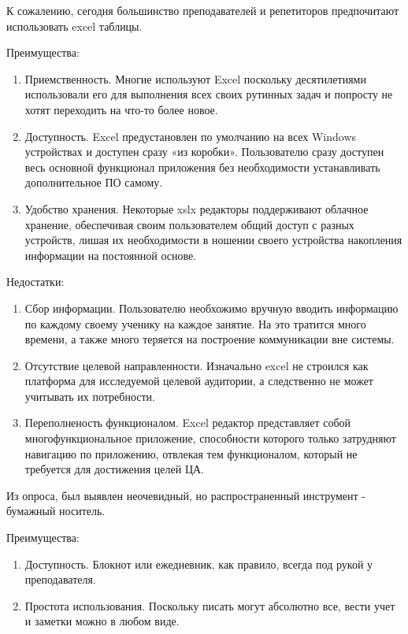 \documentclass[a4paper,14pt,oneside]{extreport}
\begin{document}
К сожалению, сегодня большинство преподавателей и репетиторов предпочитают использовать excel таблицы.

Преимущества:

\begin{enumerate}
    \item Приемственность. Многие используют Excel поскольку десятилетиями использовали его для выполнения всех своих рутинных задач и попросту не хотят переходить на что-то более новое.
    \item Доступность. Excel предустановлен по умолчанию на всех Windows устройствах и доступен сразу «из коробки». Пользователю сразу доступен весь основной функционал приложения без необходимости устанавливать дополнительное ПО самому.
    \item Удобство хранения. Некоторые xslx редакторы поддерживают облачное хранение, обеспечивая своим пользователем общий доступ с разных устройств, лишая их необходимости в ношении своего устройства накопления информации на постоянной основе.
\end{enumerate}

Недостатки:

\begin{enumerate}
    \item Сбор информации. Пользователю необхожимо вручную вводить информацию по каждому своему ученику на каждое занятие. На это тратится много времени, а также много теряется на построение коммуникации вне системы.
    \item Отсутствие целевой направленности. Изначально excel не строился как платформа для исследуемой целевой аудитории, а следственно не может учитывать их потребности.
    \item Переполненость функционалом. Excel редактор представляет собой многофункциональное приложение, способности которого только затрудняют навигацию по приложению, отвлекая тем функционалом, который не требуется для достижения целей ЦА.
\end{enumerate}


Из опроса, был выявлен неочевидный, но распространенный инструмент - бумажный носитель.

Преимущества:

\begin{enumerate}
    \item Доступность. Блокнот или ежедневник, как правило, всегда под рукой у преподавателя.
    \item Простота использования. Поскольку писать могут абсолютно все, вести учет и заметки можно в любом виде.
\end{enumerate}
\end{document}

